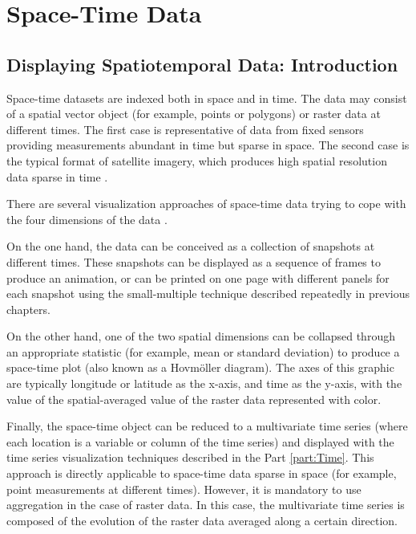 \part{Space-Time Data}
\label{cha:Spatio-Time}

\chapter{Displaying Spatiotemporal Data: Introduction}
\label{cha:introductionST}

Space-time datasets are indexed both in space and in time. The
data may consist of a spatial vector object (for example, points
or polygons) or raster data at different times. The first case is
representative of data from fixed sensors providing measurements
abundant in time but sparse in space. The second case is the
typical format of satellite imagery, which produces high spatial
resolution data sparse in time \cite{Pebesma2012}.

There are several visualization approaches of space-time data
trying to cope with the four dimensions of the data
\cite{Cressie.Wikle2011}. 

On the one hand, the data can be conceived as a collection of
snapshots at different times. These snapshots can be displayed as a
sequence of frames to produce an animation, or can be printed on one
page with different panels for each snapshot using the small-multiple
technique described repeatedly in previous chapters.

On the other hand, one of the two spatial dimensions can be collapsed
through an appropriate statistic (for example, mean or standard
deviation) to produce a space-time plot (also known as a Hovmöller
diagram). The axes of this graphic are typically longitude or latitude
as the x-axis, and time as the y-axis, with the value of the
spatial-averaged value of the raster data represented with color.

Finally, the space-time object can be reduced to a multivariate
time series (where each location is a variable or column of the
time series) and displayed with the time series visualization
techniques described in the Part \ref{part:Time}. This
approach is directly applicable to space-time data sparse in space
(for example, point measurements at different times). However, it is
mandatory to use aggregation in the case of raster data. In this
case, the multivariate time series is composed of the evolution of
the raster data averaged along a certain direction.
 
